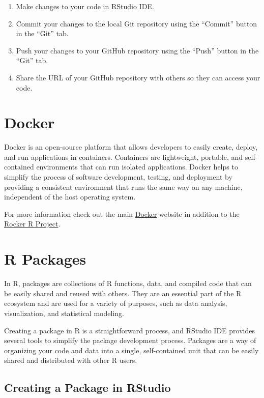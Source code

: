 \documentclass[
]{book}
\providecommand{\tightlist}{%
  \setlength{\itemsep}{0pt}\setlength{\parskip}{0pt}}
\begin{document}
\begin{enumerate}
\def\labelenumi{\arabic{enumi}.}
\tightlist
\item
  Make changes to your code in RStudio IDE.
\item
  Commit your changes to the local Git repository using the ``Commit'' button in the ``Git'' tab.
\item
  Push your changes to your GitHub repository using the ``Push'' button in the ``Git'' tab.
\item
  Share the URL of your GitHub repository with others so they can access your code.
\end{enumerate}

\hypertarget{docker}{%
\section{Docker}\label{docker}}

Docker is an open-source platform that allows developers to easily create, deploy, and run applications in containers. Containers are lightweight, portable, and self-contained environments that can run isolated applications. Docker helps to simplify the process of software development, testing, and deployment by providing a consistent environment that runs the same way on any machine, independent of the host operating system.

For more information check out the main \href{https://www.docker.com/}{Docker} website in addition to the \href{https://rocker-project.org/}{Rocker R Project}.

\hypertarget{r-packages}{%
\section{R Packages}\label{r-packages}}

In R, packages are collections of R functions, data, and compiled code that can be easily shared and reused with others. They are an essential part of the R ecosystem and are used for a variety of purposes, such as data analysis, visualization, and statistical modeling.

Creating a package in R is a straightforward process, and RStudio IDE provides several tools to simplify the package development process. Packages are a way of organizing your code and data into a single, self-contained unit that can be easily shared and distributed with other R users.

\hypertarget{creating-a-package-in-rstudio}{%
\subsection*{Creating a Package in RStudio}\label{creating-a-package-in-rstudio}}
\end{document}
